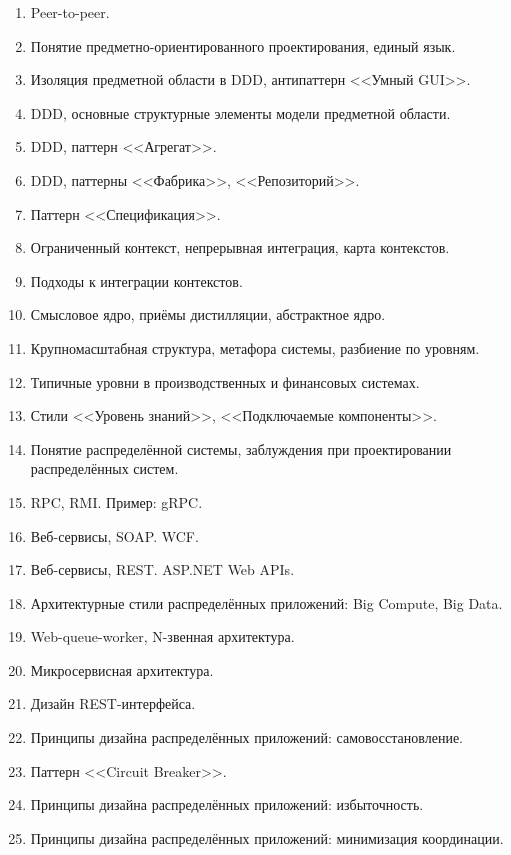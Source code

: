 \documentclass[a5paper]{article}
\begin{document}
\begin{enumerate}
    \item Peer-to-peer.
    \item Понятие предметно-ориентированного проектирования, единый язык.
    \item Изоляция предметной области в DDD, антипаттерн <<Умный GUI>>.
    \item DDD, основные структурные элементы модели предметной области.
    \item DDD, паттерн <<Агрегат>>.
    \item DDD, паттерны <<Фабрика>>, <<Репозиторий>>.
    \item Паттерн <<Спецификация>>.
    \item Ограниченный контекст, непрерывная интеграция, карта контекстов.
    \item Подходы к интеграции контекстов.
    \item Смысловое ядро, приёмы дистилляции, абстрактное ядро.
    \item Крупномасштабная структура, метафора системы, разбиение по уровням. 
    \item Типичные уровни в производственных и финансовых системах.
    \item Стили <<Уровень знаний>>, <<Подключаемые компоненты>>.
    \item Понятие распределённой системы, заблуждения при проектировании распределённых систем.
    \item RPC, RMI. Пример: gRPC.
    \item Веб-сервисы, SOAP. WCF.
    \item Веб-сервисы, REST. ASP.NET Web APIs.
    \item Архитектурные стили распределённых приложений: Big Compute, Big Data.
    \item Web-queue-worker, N-звенная архитектура.
    \item Микросервисная архитектура.
    \item Дизайн REST-интерфейса.
    \item Принципы дизайна распределённых приложений: самовосстановление.
    \item Паттерн <<Circuit Breaker>>.
    \item Принципы дизайна распределённых приложений: избыточность.
    \item Принципы дизайна распределённых приложений: минимизация координации.

\end{enumerate}
\end{document}
